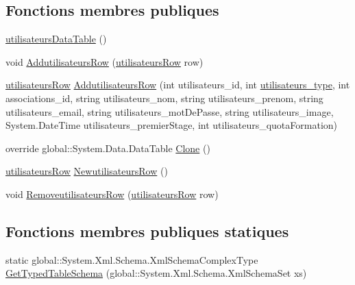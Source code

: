 \subsection*{Fonctions membres publiques}
\begin{DoxyCompactItemize}
\item 
\hyperlink{classforma_1_1formadb_data_set_1_1utilisateurs_data_table_a2c47e3f1372e96a519672e77bca22690}{utilisateurs\+Data\+Table} ()
\item 
void \hyperlink{classforma_1_1formadb_data_set_1_1utilisateurs_data_table_a6fef27e52abc0ad70b28fa0b71f44b0b}{Addutilisateurs\+Row} (\hyperlink{classforma_1_1formadb_data_set_1_1utilisateurs_row}{utilisateurs\+Row} row)
\item 
\hyperlink{classforma_1_1formadb_data_set_1_1utilisateurs_row}{utilisateurs\+Row} \hyperlink{classforma_1_1formadb_data_set_1_1utilisateurs_data_table_a5a36c9e0a2a9648c808ec91ae0b8b71d}{Addutilisateurs\+Row} (int utilisateurs\+\_\+id, int \hyperlink{classforma_1_1formadb_data_set_a1ae49a739e604d1cbd522769f4d174a4}{utilisateurs\+\_\+type}, int associations\+\_\+id, string utilisateurs\+\_\+nom, string utilisateurs\+\_\+prenom, string utilisateurs\+\_\+email, string utilisateurs\+\_\+mot\+De\+Passe, string utilisateurs\+\_\+image, System.\+Date\+Time utilisateurs\+\_\+premier\+Stage, int utilisateurs\+\_\+quota\+Formation)
\item 
override global\+::\+System.\+Data.\+Data\+Table \hyperlink{classforma_1_1formadb_data_set_1_1utilisateurs_data_table_a40285c951383ae2b98e5b5cbd547658e}{Clone} ()
\item 
\hyperlink{classforma_1_1formadb_data_set_1_1utilisateurs_row}{utilisateurs\+Row} \hyperlink{classforma_1_1formadb_data_set_1_1utilisateurs_data_table_a28737a8d71eda2f897c8efe1ea41dc30}{Newutilisateurs\+Row} ()
\item 
void \hyperlink{classforma_1_1formadb_data_set_1_1utilisateurs_data_table_a49cf52ae36acf8d1a9fce389f20a3a69}{Removeutilisateurs\+Row} (\hyperlink{classforma_1_1formadb_data_set_1_1utilisateurs_row}{utilisateurs\+Row} row)
\end{DoxyCompactItemize}
\subsection*{Fonctions membres publiques statiques}
\begin{DoxyCompactItemize}
\item 
static global\+::\+System.\+Xml.\+Schema.\+Xml\+Schema\+Complex\+Type \hyperlink{classforma_1_1formadb_data_set_1_1utilisateurs_data_table_aa042e7f976370c262d63e7048a160cde}{Get\+Typed\+Table\+Schema} (global\+::\+System.\+Xml.\+Schema.\+Xml\+Schema\+Set xs)
\end{DoxyCompactItemize}
